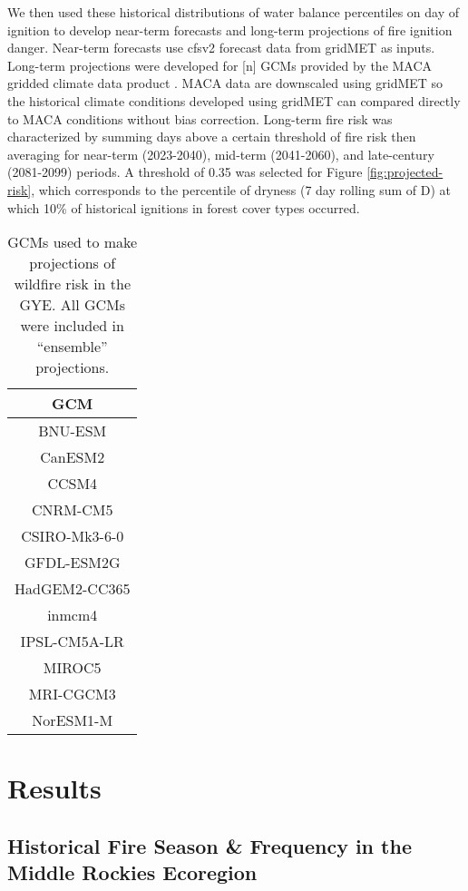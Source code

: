 \documentclass[11pt]{article}
\begin{document}
We then used these historical distributions of water balance percentiles on day of ignition to develop near-term forecasts and long-term projections of fire ignition danger.  Near-term forecasts use cfsv2 forecast data from gridMET as inputs.  Long-term projections were developed for [n] GCMs provided by the MACA gridded climate data product \citep{abatzoglouComparisonStatisticalDownscaling2012}.  MACA data are downscaled using gridMET so the historical climate conditions developed using gridMET can compared directly to MACA conditions without bias correction.  Long-term fire risk was characterized by summing days above a certain threshold of fire risk then averaging for near-term (2023-2040), mid-term (2041-2060), and late-century (2081-2099) periods.  A threshold of 0.35 was selected for Figure \ref{fig:projected-risk}, which corresponds to the percentile of dryness (7 day rolling sum of D) at which 10\% of historical ignitions in forest cover types occurred.

\begin{table}[h!]
  \centering
  \begin{tabular}{ c }
    \hline
    GCM \\
    \hline
    BNU-ESM \\
    CanESM2 \\
    CCSM4 \\
    CNRM-CM5 \\
    CSIRO-Mk3-6-0 \\
    GFDL-ESM2G \\
    HadGEM2-CC365 \\
    inmcm4 \\
    IPSL-CM5A-LR \\
    MIROC5 \\
    MRI-CGCM3 \\
    NorESM1-M \\
    \hline
  \end{tabular}
  \caption{GCMs used to make projections of wildfire risk in the GYE.  All GCMs were included in ``ensemble'' projections.}
  \label{table:gcms}
\end{table}

\section{Results}

\subsection{Historical Fire Season \& Frequency in the Middle Rockies Ecoregion}
\end{document}
